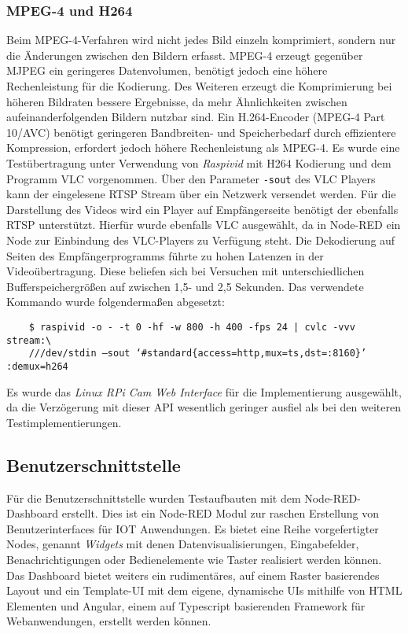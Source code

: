 \documentclass[BMR,Bachelor,ngerman]{twbook}%
\begin{document}
\subsubsection{\ac{MPEG}-4 und H264} Beim MPEG-4-Verfahren wird nicht jedes Bild einzeln komprimiert, sondern nur die Änderungen zwischen den Bildern erfasst. MPEG-4 erzeugt gegenüber \ac{MJPEG} ein geringeres Datenvolumen, benötigt jedoch eine höhere Rechenleistung für die Kodierung. Des Weiteren erzeugt die Komprimierung bei höheren Bildraten bessere Ergebnisse, da mehr Ähnlichkeiten zwischen aufeinanderfolgenden Bildern nutzbar sind. Ein H.264-Encoder (MPEG-4 Part 10/AVC) benötigt geringeren Bandbreiten- und Speicherbedarf durch effizientere Kompression, erfordert jedoch höhere Rechenleistung als MPEG-4. Es wurde eine Testübertragung unter Verwendung von \emph{Raspivid} mit H264 Kodierung und dem Programm VLC vorgenommen. Über den Parameter \verb+-sout+ des VLC Players kann der eingelesene \ac{RTSP} Stream über ein Netzwerk versendet werden. Für die Darstellung des Videos wird ein Player auf Empfängerseite benötigt der ebenfalls \ac{RTSP} unterstützt. Hierfür wurde ebenfalls VLC ausgewählt, da in Node-RED ein Node zur Einbindung des VLC-Players zu Verfügung steht. Die Dekodierung auf Seiten des Empfängerprogramms führte zu hohen Latenzen in der Videoübertragung. Diese beliefen sich bei Versuchen mit unterschiedlichen Bufferspeichergrößen auf zwischen 1,5- und 2,5 Sekunden. Das verwendete Kommando wurde folgendermaßen abgesetzt:
\begin{verbatim}
	$ raspivid -o - -t 0 -hf -w 800 -h 400 -fps 24 | cvlc -vvv stream:\ 
	///dev/stdin —sout ‘#standard{access=http,mux=ts,dst=:8160}’ :demux=h264
\end{verbatim} 
\par Es wurde das \emph{Linux RPi Cam Web Interface} für die Implementierung ausgewählt, da die Verzögerung mit dieser \ac{API} wesentlich geringer ausfiel als bei den weiteren Testimplementierungen.
%
\subsection{Benutzerschnittstelle}
Für die Benutzerschnittstelle wurden Testaufbauten mit dem Node-RED-Dashboard \cite{dashboard} erstellt. Dies ist ein Node-RED Modul zur raschen Erstellung von Benutzerinterfaces für \ac{IOT} Anwendungen. Es bietet eine Reihe vorgefertigter Nodes, genannt \emph{Widgets} mit denen Datenvisualisierungen, Eingabefelder, Benachrichtigungen oder Bedienelemente wie Taster realisiert werden können. Das Dashboard bietet weiters ein rudimentäres, auf einem Raster basierendes Layout und ein Template-\ac{UI} mit dem eigene, dynamische \acp{UI} mithilfe von \ac{HTML} Elementen und Angular, einem auf Typescript basierenden Framework für Webanwendungen, erstellt werden können.
%
\end{document}
